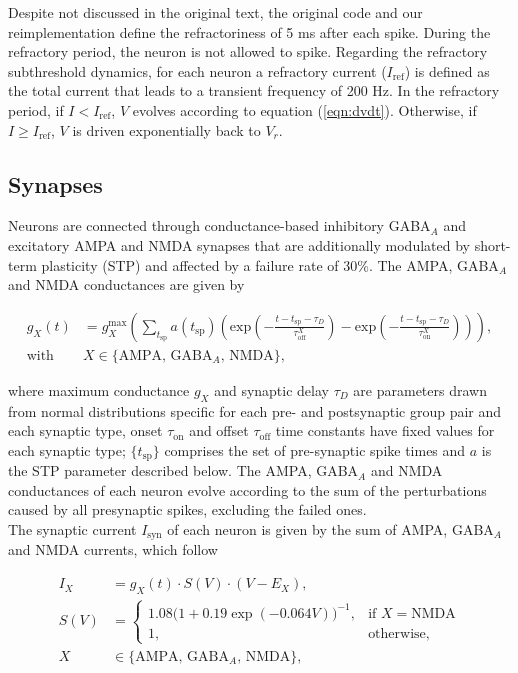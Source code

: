 Despite not discussed in the original text, the original code and our reimplementation define the refractoriness of 5 ms after each spike. During the refractory period, the neuron is not allowed to spike. Regarding the refractory subthreshold dynamics, for each neuron a refractory current ($I_{\text{ref}}$) is defined as the total current that leads to a transient frequency of 200 Hz. In the refractory period, if $I<I_{\text{ref}}$, $V$ evolves according to equation (\ref{eqn:dvdt}). Otherwise, if $I \geq I_{\text{ref}}$, $V$ is driven exponentially back to $V_r$.\\


\subsection*{Synapses}

Neurons are connected through conductance-based inhibitory GABA$_A$ and excitatory AMPA and NMDA synapses that are additionally modulated by short-term plasticity (STP) and affected by a failure rate of 30\%. The AMPA, GABA$_A$ and NMDA conductances are given by 

\begin{align}
g_X(t) &= g_X^{\text{max}} \left( \sum\limits_{t_{\text{sp}}} a(t_{\text{sp}}) \left( \text{exp}\left(- \frac{t - t_{\text{sp}} - \tau_D}{\tau_{\text{off}}^X}\right) - \text{exp}\left(- \frac{t - t_{\text{sp}} - \tau_D}{\tau_{\text{on}}^X}\right) \right) \right), \label{eqn:conductance}\\
\text{with }& X\in \text{\{AMPA, GABA$_A$, NMDA\}}, \nonumber
\end{align}

where maximum conductance $g_X$ and synaptic delay $\tau_D$ are parameters drawn from normal distributions specific for each pre- and postsynaptic group pair and each synaptic type, onset $\tau_{\text{on}}$ and offset $\tau_{\text{off}}$ time constants have fixed values for each synaptic type; $\{t_{\text{sp}}\}$ comprises the set of pre-synaptic spike times and $a$ is the STP parameter described below. The AMPA, GABA$_A$ and NMDA conductances of each neuron evolve according to the sum of the perturbations caused by all presynaptic spikes, excluding the failed ones.\\

The synaptic current $I_{\text{syn}}$ of each neuron is given by the sum of AMPA, GABA$_A$ and NMDA currents, which follow

\begin{subequations}
\begin{align}
I_X &= g_X(t) \cdot S(V) \cdot  (V - E_X), \label{eqn:current} \\
S(V)  &=
\begin{cases}
    \text{1.08}(1 + \text{0.19}  \exp{(-\text{0.064} V))}^{-1}, & \text{if } X = \text{NMDA}\\
    1,              & \text{otherwise,}
\end{cases}\\
X &\in \text{\{AMPA, GABA$_A$, NMDA\}}, \nonumber
\end{align} 
\end{subequations}


